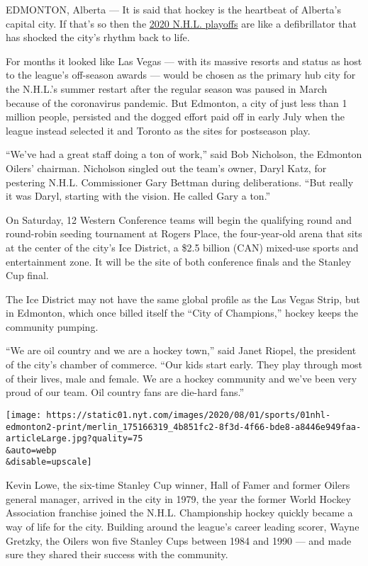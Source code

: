 EDMONTON, Alberta --- It is said that hockey is the heartbeat of
Alberta's capital city. If that's so then the
\href{https://www.nytimes.com/2020/07/06/sports/hockey/nhl-playoffs.html}{2020
N.H.L. playoffs} are like a defibrillator that has shocked the city's
rhythm back to life.

For months it looked like Las Vegas --- with its massive resorts and
status as host to the league's off-season awards --- would be chosen as
the primary hub city for the N.H.L.'s summer restart after the regular
season was paused in March because of the coronavirus pandemic. But
Edmonton, a city of just less than 1 million people, persisted and the
dogged effort paid off in early July when the league instead selected it
and Toronto as the sites for postseason play.

``We've had a great staff doing a ton of work,'' said Bob Nicholson, the
Edmonton Oilers' chairman. Nicholson singled out the team's owner, Daryl
Katz, for pestering N.H.L. Commissioner Gary Bettman during
deliberations. ``But really it was Daryl, starting with the vision. He
called Gary a ton.''

On Saturday, 12 Western Conference teams will begin the qualifying round
and round-robin seeding tournament at Rogers Place, the four-year-old
arena that sits at the center of the city's Ice District, a \$2.5
billion (CAN) mixed-use sports and entertainment zone. It will be the
site of both conference finals and the Stanley Cup final.

The Ice District may not have the same global profile as the Las Vegas
Strip, but in Edmonton, which once billed itself the ``City of
Champions,'' hockey keeps the community pumping.

``We are oil country and we are a hockey town,'' said Janet Riopel, the
president of the city's chamber of commerce. ``Our kids start early.
They play through most of their lives, male and female. We are a hockey
community and we've been very proud of our team. Oil country fans are
die-hard fans.''

\texttt{[image: https://static01.nyt.com/images/2020/08/01/sports/01nhl-edmonton2-print/merlin\_175166319\_4b851fc2-8f3d-4f66-bde8-a8446e949faa-articleLarge.jpg?quality=75\\\&auto=webp\\\&disable=upscale]}

Kevin Lowe, the six-time Stanley Cup winner, Hall of Famer and former
Oilers general manager, arrived in the city in 1979, the year the former
World Hockey Association franchise joined the N.H.L. Championship hockey
quickly became a way of life for the city. Building around the league's
career leading scorer, Wayne Gretzky, the Oilers won five Stanley Cups
between 1984 and 1990 --- and made sure they shared their success with
the community.

